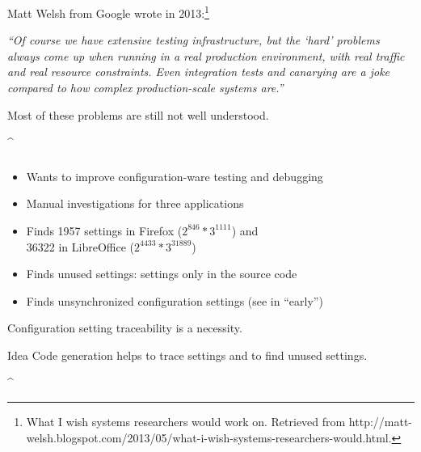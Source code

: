 \begin{frame}
	Matt Welsh from Google wrote in 2013:\footnote{What I wish systems researchers would work on. Retrieved from http://matt-welsh.blogspot.com/2013/05/what-i-wish-systems-researchers-would.html.}

	\vspace{1em}

	\emph{``Of course we have extensive testing infrastructure, but the ‘hard’ problems always
	come up when running in a real production environment, with real traffic and real
	resource constraints. Even integration tests and canarying are a joke compared to
	how complex production-scale systems are.''}

	\vspace{1em}

	Most of these problems are still not well understood.
\end{frame}

\lstDeleteShortInline^
\begin{frame}
	\frametitle{\citet{jin2014configurations}}

	\begin{itemize}
	\item Wants to improve configuration-ware testing and debugging
	\item Manual investigations for three applications
	\item Finds 1957 settings in Firefox ($2^{846} * 3^{1111}$) and \\
		36322 in LibreOffice ($2^{4433} * 3^{31889}$)
	\item Finds unused settings: settings only in the source code
	\item Finds unsynchronized configuration settings (see in ``early'')
	\end{itemize}

	\begin{requirement}
	Configuration setting traceability is a necessity.
	\end{requirement}

	\begin{alertblock}{Idea}
	Code generation helps to trace settings and to find unused settings.
	\end{alertblock}
\end{frame}
\lstMakeShortInline[postbreak=,keywordstyle={},showspaces=no]^


